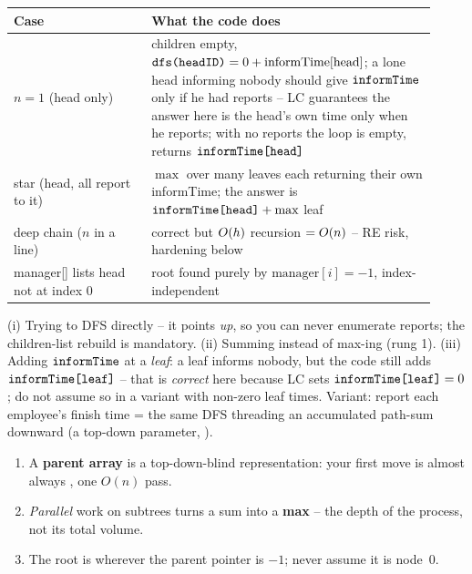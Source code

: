\begin{center}\renewcommand{\arraystretch}{1.2}
\begin{tabular}{@{}p{0.30\linewidth} p{0.62\linewidth}@{}}
\toprule
\textbf{Case} & \textbf{What the code does} \\
\midrule
$n=1$ (head only) & children empty, $\texttt{dfs(headID)}=0+\text{informTime}[\text{head}]$; a lone head informing nobody should give $\texttt{informTime}$ only if he had reports -- LC guarantees the answer here is the head's own time only when he reports; with no reports the loop is empty, returns $\texttt{informTime[head]}$ \\
star (head, all report to it) & $\max$ over many leaves each returning their own informTime; the answer is $\texttt{informTime[head]} + \max$ leaf \\
deep chain ($n$ in a line) & correct but $O(h)$ recursion $=O(n)$ -- RE risk, hardening below \\
manager[] lists head not at index 0 & root found purely by $\text{manager}[i]{=}-1$, index-independent \\
\bottomrule
\end{tabular}\end{center}

\begin{warningbox}
(i) Trying to DFS  directly -- it points \emph{up}, so you can never
enumerate reports; the children-list rebuild is mandatory. (ii) Summing instead of
max-ing (rung 1). (iii) Adding $\texttt{informTime}$ at a \emph{leaf}: a leaf informs
nobody, but the code still adds $\texttt{informTime[leaf]}$ -- that is \emph{correct} here
because LC sets $\texttt{informTime[leaf]}=0$; do not assume so in a variant with non-zero
leaf times. Variant: report each employee's finish time = the same DFS
threading an accumulated path-sum downward (a top-down parameter, ).
\end{warningbox}

\begin{insightbox}
\begin{enumerate}[nosep, leftmargin=1.6em]
  \item A \textbf{parent array} is a top-down-blind representation: your first move is
        almost always , one $O(n)$ pass.
  \item \emph{Parallel} work on subtrees turns a sum into a \textbf{max} -- the depth of
        the process, not its total volume.
  \item The root is wherever the parent pointer is $-1$; never assume it is node~$0$.
\end{enumerate}
\end{insightbox}

